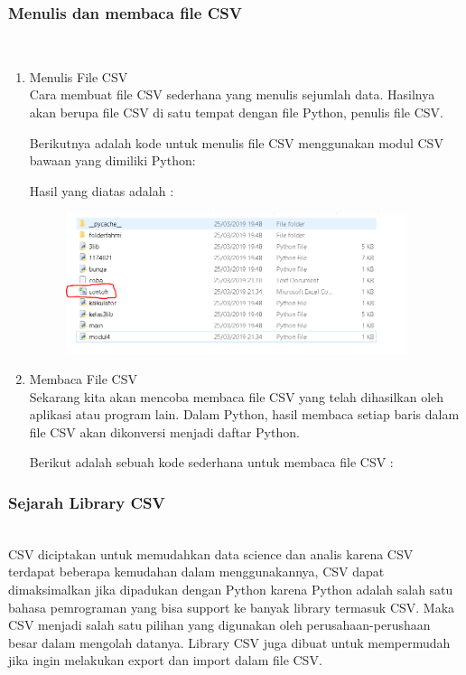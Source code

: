 \subsubsection{Menulis dan membaca file CSV} \\
\begin{enumerate} 
	\item Menulis File CSV \\
	Cara membuat file CSV sederhana yang menulis sejumlah data. Hasilnya akan berupa file CSV di satu tempat dengan file Python, penulis file CSV.
	
	Berikutnya adalah kode untuk menulis file CSV menggunakan modul CSV bawaan yang dimiliki Python:
	
	
	
	Hasil yang diatas adalah : 
	\begin{figure}[H]
		\includegraphics[width=10cm]{figures/fahmi/8.png}
		\centering
	\end{figure}

	\item Membaca File CSV \\
	Sekarang kita akan mencoba membaca file CSV yang telah dihasilkan oleh aplikasi atau program lain. Dalam Python, hasil membaca setiap baris dalam file CSV akan dikonversi menjadi daftar Python.
	
	Berikut adalah sebuah kode sederhana untuk membaca file CSV :
	
	
\end{enumerate}



\subsubsection{Sejarah Library CSV}\\
CSV diciptakan untuk memudahkan data science dan analis karena CSV terdapat beberapa kemudahan dalam menggunakannya, CSV dapat dimaksimalkan jika dipadukan dengan Python karena Python adalah salah satu bahasa pemrograman yang bisa support ke banyak library termasuk CSV. Maka CSV menjadi salah satu pilihan yang digunakan oleh perusahaan-perushaan besar dalam mengolah datanya. Library CSV juga dibuat untuk mempermudah jika ingin melakukan export dan import dalam file CSV.

